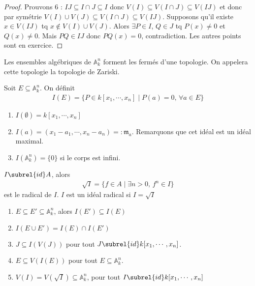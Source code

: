         \begin{proof}
            Prouvons 6 : $IJ \subseteq I \cap J \subseteq I$ donc $V(I) \subseteq V(I \cap J) \subseteq V(IJ)$ et donc par symétrie $V(I) \cup V(J) \subseteq V(I \cap J) \subseteq V(IJ)$. Supposons qu'il existe $x \in V(IJ)$ tq $x \notin V(I) \cup V(J)$. Alors $\exists P \in I$, $Q \in J$ tq $P(x) \neq 0$ et $Q(x) \neq 0$. Mais $PQ \in IJ$ donc $PQ(x) = 0$, contradiction. Les autres points sont en exercice.
        \end{proof}
        \begin{coro}
            Les ensembles algébriques de $\mathbb{A}_k^n$ forment les fermés d'une topologie. On appelera cette topologie la topologie de Zariski.
        \end{coro}
        \begin{defi}
            Soit $E \subseteq \mathbb{A}_k^n$. On définit
            \begin{align*}
                I(E) = \{P \in k[x_1, \cdots, x_n] \mid P(a) = 0 ,\, \forall a \in E\}
            \end{align*}
        \end{defi}
        \begin{expl}
            \begin{enumerate}
                \item $I(\emptyset) = k[x_1, \cdots, x_n]$
                \item $I(a) = (x_1 - a_1, \cdots, x_n - a_n) =: \mathfrak{m}_a$. Remarquons que cet idéal est un idéal maximal.
                \item $I(\mathbb{A}_k^n) = \{0\}$ si le corps est infini.
            \end{enumerate}
        \end{expl}
        \begin{defi}
            $I \subrel{id} A$, alors 
            \begin{align*}
                \sqrt{I} = \{f \in A \mid \exists n > 0,\, f^n \in I\}
            \end{align*}
            est le radical de $I$. $I$ est un idéal radical si $I = \sqrt{I}$
        \end{defi}
        \begin{prop}
            \begin{enumerate}
                \item $E \subseteq E' \subseteq \mathbb{A}_k^n$, alors $I(E') \subseteq I(E)$
                \item $I(E \cup E') = I(E) \cap I(E')$
                \item $J \subseteq I(V(J))$ pour tout $J \subrel{id} k[x_1, \cdots, x_n]$.
                \item $E \subseteq V(I(E))$ pour tout $E \subseteq \mathbb{A}_k^n$.
                \item $V(I) = V(\sqrt{I}) \subseteq \mathbb{A}_k^n$, pour tout $I \subrel{id} k[x_1, \cdots, x_n]$
            \end{enumerate}
        \end{prop}
